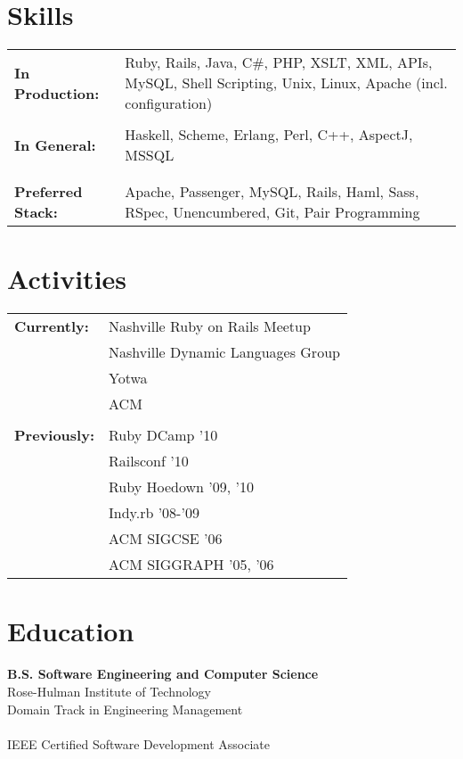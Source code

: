 \documentclass[line, margin, 10pt]{res}
\begin{document}
\begin{resume}
\section{Skills}
   \begin{tabular}[t]{@{} p{1.2in} p{3.75in} @{}}
    \bf{In Production:} & Ruby, Rails, Java, C\#, PHP, XSLT, XML, APIs, MySQL, Shell Scripting, Unix, Linux, Apache (incl. configuration) \\
    \\
    \bf{In General:} & Haskell, Scheme, Erlang, Perl, C++, AspectJ, MSSQL  \\
    \\
    \\
    \bf{Preferred Stack:} & Apache, Passenger, MySQL, Rails, Haml, Sass, RSpec, Unencumbered, Git, Pair Programming \\
 \end{tabular}

\section{Activities}
\begin{tabular}[t]{@{} p{1.2in} l @{}}
\bf{Currently:} & Nashville Ruby on Rails Meetup \\
& Nashville Dynamic Languages Group \\
& Yotwa \\
& ACM \\
\\
\bf{Previously:}
& Ruby DCamp '10 \\
& Railsconf '10 \\
& Ruby Hoedown '09, '10 \\
 & Indy.rb '08-'09 \\
& ACM SIGCSE '06 \\
& ACM SIGGRAPH '05, '06 \\
\end{tabular}

\section{Education} 
{\bf B.S. Software Engineering and Computer Science}\\
Rose-Hulman Institute of Technology\\
Domain Track in Engineering Management \\
\\
IEEE Certified Software Development Associate

\end{resume} 
\end{document}
